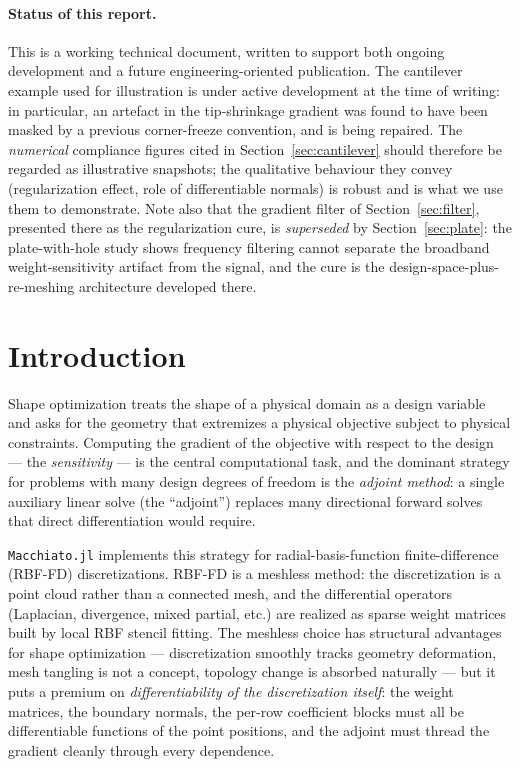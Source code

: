 \documentclass[11pt,a4paper]{article}
\begin{document}
\paragraph{Status of this report.}
This is a working technical document, written to support both
ongoing development and a future engineering-oriented publication.
The cantilever example used for illustration is under active
development at the time of writing: in particular, an artefact in
the tip-shrinkage gradient was found to have been masked by a
previous corner-freeze convention, and is being repaired. The
\emph{numerical} compliance figures cited in
Section~\ref{sec:cantilever} should therefore be regarded as
illustrative snapshots; the qualitative behaviour they convey
(regularization effect, role of differentiable normals) is robust
and is what we use them to demonstrate. Note also that the gradient
filter of Section~\ref{sec:filter}, presented there as the
regularization cure, is \emph{superseded} by Section~\ref{sec:plate}:
the plate-with-hole study shows frequency filtering cannot separate the
broadband weight-sensitivity artifact from the signal, and the cure is
the design-space-plus-re-meshing architecture developed there.

\tableofcontents
\bigskip

\section{Introduction}
\label{sec:intro}

Shape optimization treats the shape of a physical domain as a design
variable and asks for the geometry that extremizes a physical
objective subject to physical constraints. Computing the gradient of
the objective with respect to the design — the \emph{sensitivity} —
is the central computational task, and the dominant strategy for
problems with many design degrees of freedom is the \emph{adjoint
method}: a single auxiliary linear solve (the ``adjoint'') replaces
many directional forward solves that direct differentiation would
require.

\texttt{Macchiato.jl} implements this strategy for radial-basis-function
finite-difference (RBF-FD) discretizations. RBF-FD is a meshless
method: the discretization is a point cloud rather than a connected
mesh, and the differential operators (Laplacian, divergence, mixed
partial, etc.) are realized as sparse weight matrices built by local
RBF stencil fitting. The meshless choice has structural advantages for
shape optimization — discretization smoothly tracks geometry
deformation, mesh tangling is not a concept, topology change is
absorbed naturally — but it puts a premium on \emph{differentiability
of the discretization itself}: the weight matrices, the boundary
normals, the per-row coefficient blocks must all be differentiable
functions of the point positions, and the adjoint must thread the
gradient cleanly through every dependence.
\end{document}
